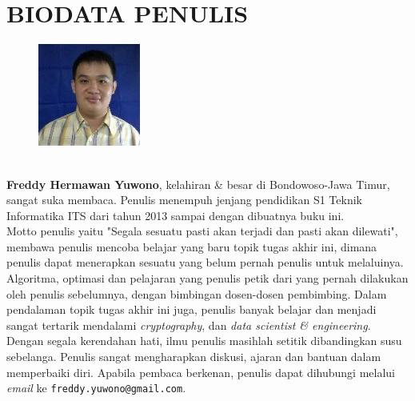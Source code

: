 \chapter{BIODATA PENULIS}
		\begin{figure}
			\includegraphics[width=0.3\textwidth]{images/foto-diri.jpg}
		\end{figure}
		\textbf{\ \\Freddy Hermawan Yuwono}, kelahiran \& besar di Bondowoso-Jawa Timur, sangat suka membaca. Penulis menempuh jenjang pendidikan S1 Teknik Informatika ITS dari tahun 2013 sampai dengan dibuatnya buku ini.\\
		
		\indent Motto penulis yaitu "Segala sesuatu pasti akan terjadi dan pasti akan dilewati", membawa penulis mencoba belajar yang baru topik tugas akhir ini, dimana penulis dapat menerapkan sesuatu yang belum pernah penulis untuk melaluinya. Algoritma, optimasi dan pelajaran yang penulis petik dari yang pernah dilakukan oleh penulis sebelumnya, dengan bimbingan dosen-dosen pembimbing. Dalam pendalaman topik tugas akhir ini juga, penulis banyak belajar dan menjadi sangat tertarik mendalami \textit{cryptography}, dan \textit{data scientist \& engineering}. \\
		\indent Dengan segala kerendahan hati, ilmu penulis masihlah setitik dibandingkan susu sebelanga. Penulis sangat mengharapkan diskusi, ajaran dan bantuan dalam memperbaiki diri. Apabila pembaca berkenan, penulis dapat dihubungi melalui \textit{email} ke \texttt{freddy.yuwono@gmail.com}.


